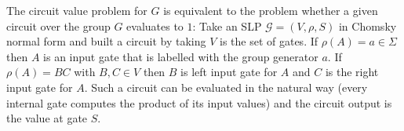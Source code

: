 The circuit value problem for $G$ is equivalent to the problem whether a given circuit over the group $G$ evaluates to $1$: Take an SLP $\mathcal{G} = (V,\rho,S)$ in
Chomsky normal form and built a circuit by taking $V$ is the set of gates. If $\rho(A)=a  \in \Sigma$ then $A$ is an input gate that is labelled
with the group generator $a$. If $\rho(A) = BC$ with $B,C \in V$ then $B$ is left input gate for $A$ and $C$ is the right input gate for $A$.
Such a circuit can be evaluated in the natural way (every internal gate computes the product of its input values) and the circuit output is the value
at gate $S$. 


